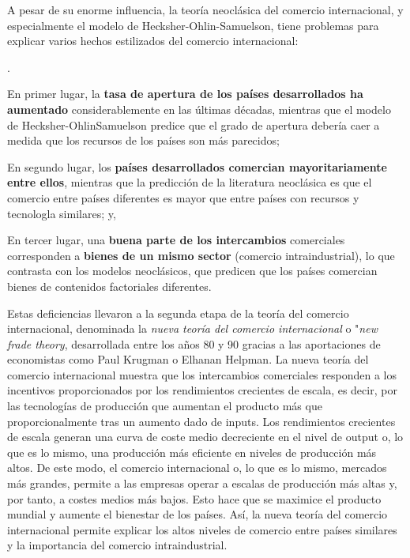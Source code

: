 \documentclass[10pt,a4paper]{article}
\newcounter{numitem}
\newenvironment{lnum}
      {\begin{list}{\arabic{numitem}.}{%
          \usecounter{numitem}%
          \setlength{\leftmargin}{1cm}%
          \setlength{\parskip}{3pt}%
          \setlength{\itemsep}{0pt}%
          \setlength{\parsep}{0pt}%
      }}
      {\end{list}}
\begin{document}
A pesar de su enorme influencia, la teoría neoclásica del comercio internacional, y especialmente el modelo de Hecksher-Ohlin-Samuelson, tiene problemas para explicar varios hechos estilizados del comercio internacional:
\begin{lnum}
    \item En primer lugar, la \textbf{tasa de apertura de los países desarrollados ha aumentado} considerablemente en las últimas décadas, mientras que el modelo de Hecksher-OhlinSamuelson predice que el grado de apertura debería caer a medida que los recursos de los países son más parecidos;
    \item En segundo lugar, los \textbf{países desarrollados comercian mayoritariamente entre ellos}, mientras que la predicción de la literatura neoclásica es que el comercio entre países diferentes es mayor que entre países con recursos y tecnologla similares; y,
    \item En tercer lugar, una \textbf{buena parte de los intercambios} comerciales corresponden a \textbf{bienes de un mismo sector} (comercio intraindustrial), lo que contrasta con los modelos neoclásicos, que predicen que los países comercian bienes de contenidos factoriales diferentes.
\end{lnum}


Estas deficiencias llevaron a la segunda etapa de la teoría del comercio internacional, denominada la \textit{nueva teoría del comercio internacional} o "\textit{new frade theory}, desarrollada entre los años 80 y 90 gracias a las aportaciones de economistas como Paul Krugman o Elhanan Helpman. La nueva teoría del comercio internacional muestra que los intercambios comerciales responden a los incentivos proporcionados por los rendimientos crecientes de escala, es decir, por las tecnologías de producción que aumentan el producto más que proporcionalmente tras un aumento dado de inputs. Los rendimientos crecientes de escala generan una curva de coste medio decreciente en el nivel de output o, lo que es lo mismo, una producción más eficiente en niveles de producción más altos. De este modo, el comercio internacional o, lo que es lo mismo, mercados más grandes, permite a las empresas operar a escalas de producción más altas y, por tanto, a costes medios más bajos. Esto hace que se maximice el producto mundial y aumente el bienestar de los países. Así, la nueva teoría del comercio internacional permite explicar los altos niveles de comercio entre países similares y la importancia del comercio intraindustrial.
\end{document}
